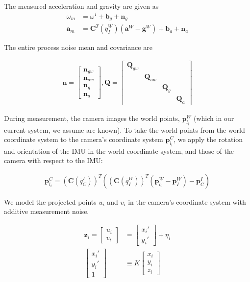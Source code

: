 \documentclass[letterpaper]{article}
\newcommand{\bb}[1]{\mathbf{#1}}
\begin{document}
The measured acceleration and gravity are given as
\begin{align}
\omega_m&=\omega^I+\bb{b}_g+\bb{n}_g \nonumber \\
\bb{a}_m&=\bb{C}^T(\overline{q}_I^W)(\bb{a}^W-\bb{g}^W)+\bb{b}_a+\bb{n}_a
\end{align}

The entire process noise mean and covariance are

\begin{align}
\bb{n}=\begin{bmatrix} \bb{n}_{gw} \\ \bb{n}_{aw} \\ \bb{n}_g\\ \bb{n}_a \end{bmatrix}, \bb{Q}=\begin{bmatrix} \bb{Q}_{gw} & & & \\ & \bb{Q}_{aw} & & \\ & & \bb{Q}_g & \\ & & & \bb{Q}_a \end{bmatrix}
\end{align}

During measurement, the camera images the world points, $\bb{p}_{l_i}^W$ (which in our current system, we assume are known). To take the world points from the world coordinate system to the camera's coordinate system $\bb{p}_{l_i}^C$, we apply the rotation and orientation of the IMU in the world coordinate system, and those of the camera with respect to the IMU:

\begin{align}
\bb{p}_{l_i}^C=(\bb{C}(\overline{q}_C^I))^T \left((\bb{C}(\overline{q}_I^W))^T \left(\bb{p}_{l_i}^W-\bb{p}_I^W\right) -\bb{p}_C^I \right)
\end{align}

We model the projected points $u_i$ and $v_i$ in the camera's coordinate system with additive measurement noise. 

\begin{align}
\bb{z}_i=\begin{bmatrix} u_i \\ v_i \end{bmatrix}&=\begin{bmatrix} x_i' \\ y_i' \end{bmatrix}+\eta_i \nonumber\\
\begin{bmatrix} x_i' \\ y_i' \\ 1 \end{bmatrix} & \equiv K\begin{bmatrix} x_i \\ y_i  \\ z_i \end{bmatrix}
\end{align}
\end{document}
